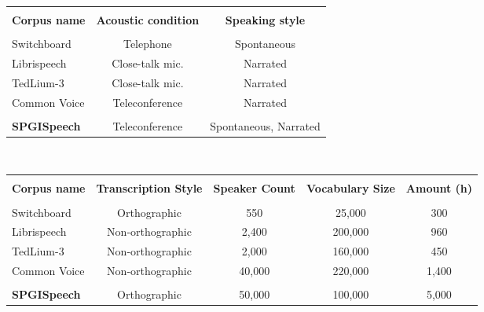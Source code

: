\documentclass{article}
\newcommand\tabref{Table~\ref}
\newcommand{\corpus}{SPGISpeech}
\begin{document}
\begin{table*}[ht]
  \centering
  


\begin{tabular}{l|cc}
\hline
  \\ [-2.2ex]
\textbf{Corpus name} & \textbf{Acoustic condition} & \textbf{Speaking style}               \\
\hline
\hline
\\ [-2.2ex]
Switchboard & Telephone          & Spontaneous                                         \\
Librispeech & Close-talk mic.    & Narrated                                             \\
TedLium-3   & Close-talk mic.    & Narrated                                              \\
  Common Voice  & Teleconference     & Narrated       \\
\hline
\\ [-2.2ex]
  \textbf{\corpus{}}  & Teleconference     & Spontaneous, Narrated       \\
  \hline
\end{tabular}
\\
\vspace{10pt}
\begin{tabular}{l|cccc}
\hline
\\ [-2.2ex]
\textbf{Corpus name} & \textbf{Transcription Style} & \textbf{Speaker Count} & \textbf{Vocabulary Size} & \textbf{Amount (h)} \\
\hline
\hline
\\ [-2.2ex]
Switchboard  &Orthographic&550 &25,000 & 300        \\
Librispeech &Non-orthographic &  2,400& 200,000 & 960        \\
TedLium-3   &Non-orthographic &  2,000 &  160,000 & 450        \\
  Common Voice  &Non-orthographic & 40,000 & 220,000 & 1,400\\
\hline
\\ [-2.2ex]
  \textbf{\corpus{}}  & Orthographic &  50,000 & 100,000 & 5,000\\
  \hline
\end{tabular}
  \\ [1.0ex]
    \caption{\textbf{Comparison of \corpus{} to peer corpora.}  For a
  select group of comparable STT corpora, we compare the recording
  format, discursive domain, metadata and quantity of audio.  Numeric data are rounded; precise values for \corpus{} are given in \tabref{tab:stats}.}
\label{tab-comparison}
\end{table*}
\end{document}
